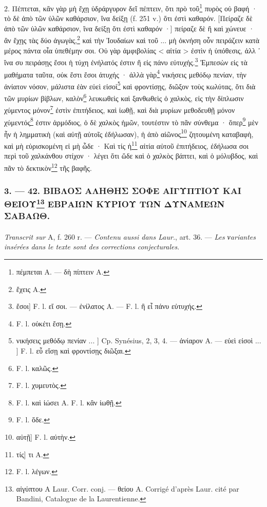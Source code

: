 \documentclass[a4paper, 11pt, oneside, polutonikogreek, french]{article}
\begin{document}
2. Πέπτεται, κἂν γὰρ μὴ ἔχῃ ὑδράργυρον δεῖ πέπτειν, ὅτι πρὸ τοῦ\footnote{πέμπεται A. --- δὴ πίπτειν A.} πυρὸς οὐ βαφή · τὸ δὲ ἀπὸ τῶν ὑλῶν καθάρσιον, ἵνα δείξῃ (f. 251 v.) ὅτι ἐστὶ καθαρόν. [Πείραζε δὲ ἀπὸ τῶν ὑλῶν καθάρσιον, ἵνα δείξῃ ὅτι ἐστὶ καθαρόν ·] πείραζε δὲ ἢ καὶ χώνευε · ἂν ἔχῃς τὰς δύο ἀγωγὰς,\footnote{ἔχεις A.} καὶ τὴν Ἰουδαίων καὶ τοῦ ... μὴ ὀκνήση οὖν πειράζειν κατὰ μέρος πάντα οἷα ὑπεθέμην σοι. Οὐ γὰρ ἀμφιβολίας < αἰτία > ἐστὶν ἡ ὑπόθεσις, ἀλλ ᾽ ἵνα συ πειράσῃς ἔσοι ἡ τύχη ἐνήλατός ἐστιν ἢ εἰς πάνυ εὐτυχής.\footnote{ἔσοι] F. l. εἴ σοι. --- ἐνίλατος A. --- F. l. ἢ εἶ πάνυ εὐτυχής.} Ἐμπεσὼν εἰς τὰ μαθήματα ταῦτα, οὐκ ἔστι ἔσοι ἀτυχής · ἀλλὰ γὰρ\footnote{F. l. οὐκέτι ἔσῃ.} νικήσεις μεθόδῳ πενίαν, τὴν ἀνίατον νόσον, μάλιστα ἐὰν εὐεὶ εἰσοὶ\footnote{νικήσεις μεθόδῳ πενίαν ... ] Cp. Synésius, 2, 3, 4. --- ἀνίαρον A. --- εὐεὶ εἰσοὶ ... ] F. l. εὗ εἴσῃ καὶ φροντίσῃς διῶξαι.} καὶ φροντίσῃς, διῶξον τοὺς κωλύτας, ὅτι διὰ τῶν μυρίων βίβλων, καλὸν\footnote{F. l. καλῶς.} λευκωθεὶς καὶ ξανθωθεὶς ὁ χαλκὸς, εἰς τὴν δίπλωσιν χύμεντος μόνον\footnote{F. l. χυμευτὸς.} ἐστὶν ἐπιτήδειος, καὶ ἰωθῇ, καὶ διὰ μυρίων μεθοδευθῇ μόνον χύμεντός\footnote{F. l. καὶ ἰώσει A. F. l. κἂν ἰωθῇ.} ἐστιν ἁρμόδιος, ὁ δὲ χαλκὸς ἡμῶν, τουτέστιν τὸ πᾶν σύνθεμα · ὅπερ\footnote{F. l. ὅδε.} μὲν ἦν ἡ λημματικὴ (καὶ αὐτῇ αὐτοῖς ἐδήλωσαν), ἡ ἀπὸ αἰῶνος\footnote{αὐτῇ] F. l. αὐτὴν.} ζητουμένη καταβαφὴ, καὶ μὴ εὑρισκομένη εἰ μὴ ὧδε · Καὶ τίς ἡ\footnote{τίς] τι A.} αἰτία αὐτοῦ ἐπιτήδειος, ἐδήλωσα σοι περὶ τοῦ χαλκάνθου στίχον · λέγει ὅτι ὥδε καὶ ὁ χαλκὸς βάπτει, καὶ ὁ μόλυβδος, καὶ πᾶν τὸ δεκτικὸν\footnote{F. l. λέγων.} τῆς βαφῆς.

\bigskip
\centerline{\EightStarTaper}
\centerline{\EightStarTaper\EightStarTaper}
\bigskip

\subsubsection[3. --- 42. ΒΙΒΛΟΣ ΑΛΗΘΗΣ ΣΟΦΕ ΑΙΓΥΠΤΙΟΥ ΚΑΙ ΘΕΙΟΥ ΕΒΡΑΙΩΝ ΚΥΡΙΟΥ ΤΩΝ ΔΥΝΑΜΕΩΝ ΣΑΒΑΩΘ.]{3. --- 42. ΒΙΒΛΟΣ ΑΛΗΘΗΣ ΣΟΦΕ ΑΙΓΥΠΤΙΟΥ ΚΑΙ ΘΕΙΟΥ\footnote{αἰγύπτου A Laur. Corr. conj. --- θείου A. Corrigé d'après Laur. cité par Bandini, Catalogue de la Laurentienne.} ΕΒΡΑΙΩΝ ΚΥΡΙΟΥ ΤΩΝ ΔΥΝΑΜΕΩΝ ΣΑΒΑΩΘ.}
\paragraph{}
\emph{Transcrit sur} A, f. 260 r. --- \emph{Contenu aussi dans Laur.}, art. 36. --- \emph{Les νariantes insérées dans le texte sont des corrections conjecturales}.
\end{document}
